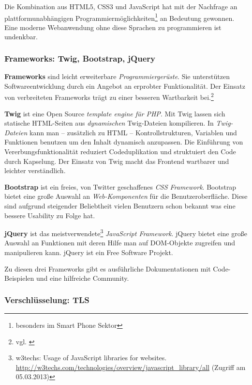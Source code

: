 \documentclass[12pt,a4paper,pointednumbers,abstracton]{scrartcl}
\begin{document}
Die Kombination aus HTML5, CSS3 und JavaScript hat mit der Nachfrage an plattformunabhängigen Programmiermöglichkeiten\footnote{besonders im Smart Phone Sektor} an Bedeutung gewonnen.
Eine moderne Webanwendung ohne diese Sprachen zu programmieren ist undenkbar.

\subsubsection{Frameworks: Twig, Bootstrap, jQuery}

\textbf{Frameworks} sind leicht erweiterbare \emph{Programmiergerüste}.
Sie unterstützen Softwareentwicklung durch ein Angebot an erprobter Funktionalität.
Der Einsatz von verbreiteten Frameworks trägt zu einer besseren Wartbarkeit bei.\footnote{vgl. \cite[Chapter 16]{Som10}}

\textbf{Twig} ist eine Open Source \emph{template engine für PHP}.
Mit Twig lassen sich statische HTML-Seiten aus \emph{dynamischen} Twig-Dateien kompilieren.
In \emph{Twig-Dateien} kann man -- zusätzlich zu HTML -- Kontrollstrukturen, Variablen und Funktionen benutzen um den Inhalt dynamisch anzupassen.
Die Einführung von Vererbungsfunktionalität reduziert Codeduplikation und struktuiert den Code durch Kapselung.
Der Einsatz von Twig macht das Frontend wartbarer und leichter verständlich.

\textbf{Bootstrap} ist ein freies, von Twitter geschaffenes \emph{CSS Framework}.
Bootstrap bietet eine große Auswahl an \emph{Web-Komponenten} für die Benutzeroberfläche.
Diese sind aufgrund steigender Beliebtheit vielen Benutzern schon bekannt was eine bessere Usability zu Folge hat.

\textbf{jQuery} ist das meistverwendete\footnote{w3techs: Usage of JavaScript libraries for websites. \url{http://w3techs.com/technologies/overview/javascript_library/all} (Zugriff am 05.03.2013)} \emph{JavaScript Framework}.
jQuery bietet eine große Auswahl an Funktionen mit deren Hilfe man auf DOM-Objekte zugreifen und manipulieren kann.
jQuery ist ein Free Software Projekt.

Zu diesen drei Frameworks gibt es ausführliche Dokumentationen mit Code-Beispielen und eine hilfreiche Community.

\subsubsection{Verschlüsselung: TLS}
\label{sec:oauth-infrz/tls}
\end{document}
